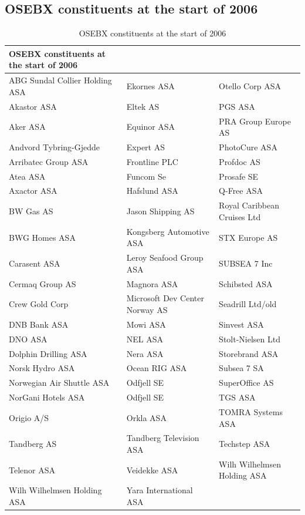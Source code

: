 \subsection{OSEBX constituents at the start of 2006}
\begin{table}[H]
\centering
\begin{tabularx}{\textwidth}{X X X}
\toprule
OSEBX constituents at the start of 2006   \\ 
\midrule
ABG Sundal Collier Holding ASA & Ekornes ASA & Otello Corp ASA \\
Akastor ASA & Eltek AS & PGS ASA \\
Aker ASA & Equinor ASA & PRA Group Europe AS \\
Andvord Tybring-Gjedde & Expert AS & PhotoCure ASA \\
Arribatec Group ASA & Frontline PLC & Profdoc AS \\
Atea ASA & Funcom Se & Prosafe SE \\
Axactor ASA & Hafslund ASA & Q-Free ASA \\
BW Gas AS & Jason Shipping AS & Royal Caribbean Cruises Ltd \\
BWG Homes ASA & Kongsberg Automotive ASA & STX Europe AS \\
Carasent ASA & Leroy Seafood Group ASA & SUBSEA 7 Inc \\
Cermaq Group AS & Magnora ASA & Schibsted ASA \\
Crew Gold Corp & Microsoft Dev Center Norway AS & Seadrill Ltd/old \\
DNB Bank ASA & Mowi ASA & Sinvest ASA \\
DNO ASA & NEL ASA & Stolt-Nielsen Ltd \\
Dolphin Drilling ASA & Nera ASA & Storebrand ASA \\
Norsk Hydro ASA & Ocean RIG ASA & Subsea 7 SA \\
Norwegian Air Shuttle ASA & Odfjell SE & SuperOffice AS \\
NorGani Hotels ASA & Odfjell SE & TGS ASA \\
Origio A/S & Orkla ASA & TOMRA Systems ASA \\
Tandberg AS & Tandberg Television ASA & Techstep ASA \\
Telenor ASA & Veidekke ASA & Wilh Wilhelmsen Holding ASA \\
Wilh Wilhelmsen Holding ASA & Yara International ASA &  \\
\bottomrule
\end{tabularx}
\vspace{1em}
\caption{OSEBX constituents at the start of 2006}
\label{osebx-constituents-start-of-2006}
\end{table}
\newpage
\clearpage

